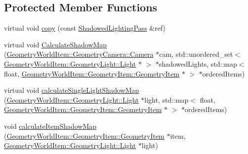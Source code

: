 \subsection*{Protected Member Functions}
\begin{DoxyCompactItemize}
\item 
virtual void \mbox{\hyperlink{class_geometry_engine_1_1_geometry_render_step_1_1_shadowed_lighting_pass_add7b889c49a68911f675ee44ab656699}{copy}} (const \mbox{\hyperlink{class_geometry_engine_1_1_geometry_render_step_1_1_shadowed_lighting_pass}{Shadowed\+Lighting\+Pass}} \&ref)
\item 
virtual void \mbox{\hyperlink{class_geometry_engine_1_1_geometry_render_step_1_1_shadowed_lighting_pass_a334def4e89daed915b4dae14eda7bad7}{Calculate\+Shadow\+Map}} (\mbox{\hyperlink{class_geometry_engine_1_1_geometry_world_item_1_1_geometry_camera_1_1_camera}{Geometry\+World\+Item\+::\+Geometry\+Camera\+::\+Camera}} $\ast$cam, std\+::unordered\+\_\+set$<$ \mbox{\hyperlink{class_geometry_engine_1_1_geometry_world_item_1_1_geometry_light_1_1_light}{Geometry\+World\+Item\+::\+Geometry\+Light\+::\+Light}} $\ast$ $>$ $\ast$shadowed\+Lights, std\+::map$<$ float, \mbox{\hyperlink{class_geometry_engine_1_1_geometry_world_item_1_1_geometry_item_1_1_geometry_item}{Geometry\+World\+Item\+::\+Geometry\+Item\+::\+Geometry\+Item}} $\ast$ $>$ $\ast$ordered\+Items)
\item 
virtual void \mbox{\hyperlink{class_geometry_engine_1_1_geometry_render_step_1_1_shadowed_lighting_pass_a320f70c119cf553c2ce4f1ed44671a1c}{calculate\+Single\+Light\+Shadow\+Map}} (\mbox{\hyperlink{class_geometry_engine_1_1_geometry_world_item_1_1_geometry_light_1_1_light}{Geometry\+World\+Item\+::\+Geometry\+Light\+::\+Light}} $\ast$light, std\+::map$<$ float, \mbox{\hyperlink{class_geometry_engine_1_1_geometry_world_item_1_1_geometry_item_1_1_geometry_item}{Geometry\+World\+Item\+::\+Geometry\+Item\+::\+Geometry\+Item}} $\ast$ $>$ $\ast$ordered\+Items)
\item 
\mbox{\label{class_geometry_engine_1_1_geometry_render_step_1_1_shadowed_lighting_pass_af8c4ac2fc09992fc55abd37ede6bef7b}} 
void \mbox{\hyperlink{class_geometry_engine_1_1_geometry_render_step_1_1_shadowed_lighting_pass_af8c4ac2fc09992fc55abd37ede6bef7b}{calculate\+Item\+Shadow\+Map}} (\mbox{\hyperlink{class_geometry_engine_1_1_geometry_world_item_1_1_geometry_item_1_1_geometry_item}{Geometry\+World\+Item\+::\+Geometry\+Item\+::\+Geometry\+Item}} $\ast$item, \mbox{\hyperlink{class_geometry_engine_1_1_geometry_world_item_1_1_geometry_light_1_1_light}{Geometry\+World\+Item\+::\+Geometry\+Light\+::\+Light}} $\ast$light)

\end{DoxyCompactItemize}
